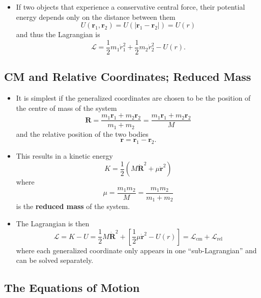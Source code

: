 \documentclass{article}
\renewcommand{\vec}[1]{\boldsymbol{\mathbf{#1}}}
\newcommand{\dvec}[1]{\dot{\vec{#1}}}
\begin{document}
\begin{itemize}
  \item If two objects that experience a conservative central force, their potential energy depends only on the distance between them \[U(\vec{r}_1, \vec{r}_2) = U(|\vec{r}_1 - \vec{r}_2|) = U(r)\] and thus the Lagrangian is \[\mathcal{L} = \frac{1}{2} m_1 \dot{r}_1^2 + \frac{1}{2} m_2 \dot{r}_2^2 - U(r).\]
\end{itemize}

\subsection{CM and Relative Coordinates; Reduced Mass}

\begin{itemize}
  \item It is simplest if the generalized coordinates are chosen to be the position of the centre of mass of the system \[\vec{R} = \frac{m_1 \vec{r}_1 + m_2 \vec{r}_2}{m_1 + m_2} = \frac{m_1 \vec{r}_1 + m_2 \vec{r}_2}{M}\] and the relative position of the two bodies \[\vec{r} = \vec{r}_1 - \vec{r}_2.\]

  \item This results in a kinetic energy \[K = \frac{1}{2} (M \dvec{R}^2 + \mu \dvec{r}^2)\] where \[\mu = \frac{m_1 m_2}{M} = \frac{m_1 m_2}{m_1 + m_2}\] is the \textbf{reduced mass} of the system.

  \item The Lagrangian is then \[\mathcal{L} = K - U = \frac{1}{2} M \dvec{R}^2 + \left[ \frac{1}{2} \mu \dvec{r}^2 - U(r) \right] = \mathcal{L}_\text{cm} + \mathcal{L}_\text{rel}\] where each generalized coordinate only appears in one ``sub-Lagrangian'' and can be solved separately.
\end{itemize}

\subsection{The Equations of Motion}
\end{document}
